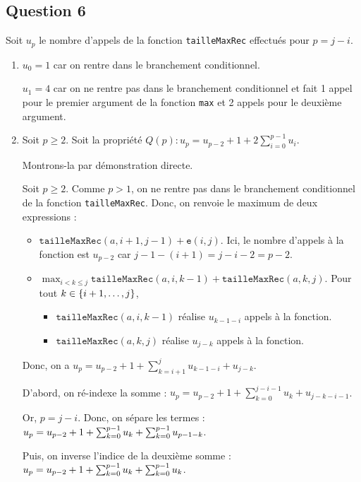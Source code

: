 \documentclass[12pt,a4paper]{article}
\begin{document}
\subsection{Question 6}
Soit \( u_p \) le nombre d'appels de la fonction \texttt{tailleMaxRec} effectu\'es pour \( p = j-i \).
\begin{enumerate}
	\item \( u_0 = 1 \) car on rentre dans le branchement conditionnel.
	
	\( u_1 = 4 \) car on ne rentre pas dans le branchement conditionnel et fait 1 appel pour le premier argument de la fonction \texttt{max} et 2 appels pour le deuxi\`eme argument.
	\item Soit \( p \geq 2 \). Soit la propri\'et\'e \( Q(p): u_p = u_{p-2} + 1 + 2\sum_{i=0}^{p-1}{u_i} \). 
	
	Montrons-la par d\'emonstration directe.
	
	Soit $p\geq 2$. Comme $p > 1$, on ne rentre pas dans le branchement conditionnel de la fonction \texttt{tailleMaxRec}. Donc, on renvoie le maximum de deux expressions :
	
	\begin{itemize}
		\item $\texttt{tailleMaxRec}(a,i+1,j-1) + \texttt{e}(i,j)$. Ici, le nombre d'appels \`a la fonction est $u_{p-2}$ car $j-1-(i+1)=j-i-2=p-2$.
		\item \( \displaystyle\max_{i < k \leq j} {\texttt{tailleMaxRec}(a,i,k-1)+\texttt{tailleMaxRec}(a,k,j)} \). Pour tout $\\k \in \{i+1, \dotsc, j\}$, 
		\begin{itemize}
			\item $\texttt{tailleMaxRec}(a,i,k-1)$ r\'ealise $u_{k-1-i}$ appels \`a la fonction. 
			\item $\texttt{tailleMaxRec}(a,k,j)$ r\'ealise $u_{j-k}$ appels \`a la fonction.
		\end{itemize}
	\end{itemize}
	Donc, on a $u_p=u_{p-2}+1+\sum_{k=i+1}^{j}{u_{k-1-i}+u_{j-k}}$. 
	
	D'abord, on r\'e-indexe la somme : $u_p=u_{p-2}+1+\sum_{k=0}^{j-i-1}{u_{k}+u_{j-k-i-1}}$. 
	
	Or, $p=j-i$. Donc, on s\'epare les termes : $\\u_p=u_{p-2}+1+\sum_{k=0}^{p-1}{u_{k}}+\sum_{k=0}^{p-1}{u_{p-1-k}}$. 
	
	Puis, on inverse l'indice de la deuxi\`eme somme : $\\u_p=u_{p-2}+1+\sum_{k=0}^{p-1}{u_{k}}+\sum_{k=0}^{p-1}{u_{k}}$. 
	

\end{enumerate}
\end{document}
